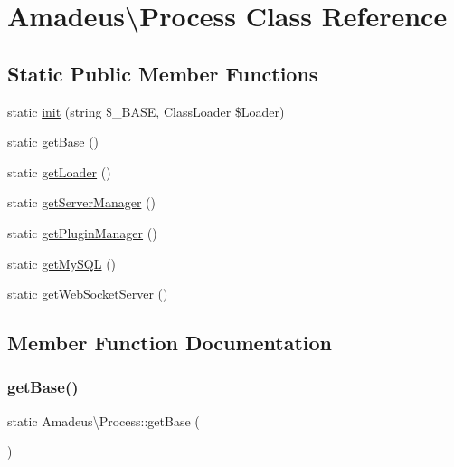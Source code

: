 \hypertarget{classAmadeus_1_1Process}{}\section{Amadeus\textbackslash{}Process Class Reference}
\label{classAmadeus_1_1Process}
\subsection*{Static Public Member Functions}
\begin{DoxyCompactItemize}
\item 
static \hyperlink{classAmadeus_1_1Process_aae77393f6d27409f31f947c66f042bde}{init} (string \$\+\_\+\+B\+A\+SE, Class\+Loader \$Loader)
\item 
static \hyperlink{classAmadeus_1_1Process_a389c7b201ef1d8978a5f3394693aed56}{get\+Base} ()
\item 
static \hyperlink{classAmadeus_1_1Process_a709b1d8fb61ae93db7eea2f472b25483}{get\+Loader} ()
\item 
static \hyperlink{classAmadeus_1_1Process_a5a67131a3a89bf03345bca386f7d37e1}{get\+Server\+Manager} ()
\item 
static \hyperlink{classAmadeus_1_1Process_a5ecdd9d95f79a99d6ce18d8e4864aa3a}{get\+Plugin\+Manager} ()
\item 
static \hyperlink{classAmadeus_1_1Process_a4d3aa8493d2d412dede81686c12c8ee7}{get\+My\+S\+QL} ()
\item 
static \hyperlink{classAmadeus_1_1Process_aa6efafb0e373aee48feb2698ed892c50}{get\+Web\+Socket\+Server} ()
\end{DoxyCompactItemize}


\subsection{Member Function Documentation}
\mbox{\label{classAmadeus_1_1Process_a389c7b201ef1d8978a5f3394693aed56}} 
\subsubsection{\texorpdfstring{get\+Base()}{getBase()}}
{\footnotesize\ttfamily static Amadeus\textbackslash{}\+Process\+::get\+Base (\begin{DoxyParamCaption}{ }\end{DoxyParamCaption})\hspace{0.3cm}{\ttfamily [static]}}

